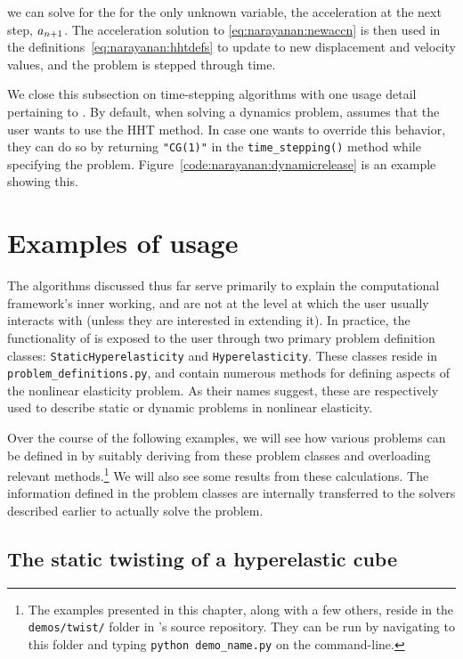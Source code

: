\noindent we can solve for the for the only unknown variable, the
acceleration at the next step, $\mbox{$ a$}_{n+1}$. The acceleration solution
to \eqref{eq:narayanan:newaccn} is then used in the
definitions~\eqref{eq:narayanan:hhtdefs} to update to new displacement
and velocity values, and the problem is stepped through time.

We close this subsection on time-stepping algorithms with one usage
detail pertaining to \twist. By default, when solving a dynamics
problem, \twist{} assumes that the user wants to use the HHT
method. In case one wants to override this behavior, they can do so
by returning {\tt "CG(1)"} in the {\tt time\_stepping()} method while
specifying the problem. Figure~\ref{code:narayanan:dynamicrelease} is
an example showing this.

\section{Examples of \twist{} usage}

The algorithms discussed thus far serve primarily to explain the
computational framework's inner working, and are not at the level at
which the user usually interacts with \twist{} (unless they are
interested in extending it). In practice, the functionality of \twist{}
is exposed to the user through two primary problem definition classes:
{\tt StaticHyperelasticity} and {\tt Hyperelasticity}. These classes
reside in {\tt problem\_definitions.py}, and contain numerous methods
for defining aspects of the nonlinear elasticity problem. As their
names suggest, these are respectively used to describe static or
dynamic problems in nonlinear elasticity.

Over the course of the following examples, we will see how various
problems can be defined in \twist{} by suitably deriving from these
problem classes and overloading relevant methods.\footnote{The
examples presented in this chapter, along with a few others, reside in
the {\tt demos/twist/} folder in \twist's source repository. They can
be run by navigating to this folder and typing {\tt python
demo\_name.py} on the command-line.} We will also see some results
from these calculations. The information defined in the problem
classes are internally transferred to the solvers described earlier to
actually solve the problem.

\subsection{The static twisting of a hyperelastic cube}

